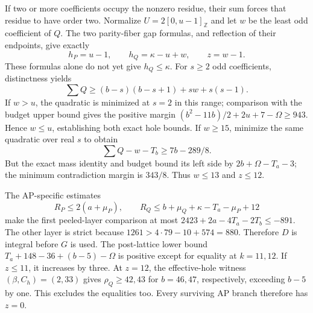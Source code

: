 \documentclass[11pt,a4paper]{article}
\theoremstyle{remark}
\newcommand{\Z}{\mathbb Z}
\begin{document}
If two or more coefficients occupy the nonzero residue, their sum
forces that residue to have order two. Normalize
$U=2[0,u-1]_{\Z}$ and let $w$ be the least odd coefficient of $Q$.
The two parity-fiber gap formulas, and reflection of their endpoints,
give exactly
\[
 h_P=u-1,\qquad h_Q=\kappa-u+w,\qquad z=w-1.
\]
These formulas alone do not yet give $h_Q\le\kappa$.
For $s\ge2$ odd coefficients, distinctness yields
\[
 \sum Q\ge(b-s)(b-s+1)+sw+s(s-1).
\]
If $w>u$, the quadratic is minimized at $s=2$ in this range;
comparison with the budget upper bound gives the positive margin
$(b^2-11b)/2+2u+7-\Omega\ge943$. Hence $w\le u$, establishing both
exact hole bounds. If $w\ge15$, minimize the same quadratic over real
$s$ to obtain
\[
 \sum Q-w-T_b\ge7b-289/8.
\]
But the exact mass identity and budget bound its left side by
$2b+\Omega-T_a-3$; the minimum contradiction margin is $343/8$.
Thus $w\le13$ and $z\le12$.

The AP-specific estimates
\[
 R_P\le2(a+\mu_P),\qquad
 R_Q\le b+\mu_Q+\kappa-T_a-\mu_P+12
\]
make the first peeled-layer comparison at most
$2423+2a-4T_a-2T_b\le-891$. The other layer is strict because
$1261>4\cdot79-10+574=880$. Therefore $D$ is integral before $G$ is
used. The post-lattice lower bound
$T_a+148-36+(b-5)-\Omega$ is positive except for equality at $k=11,12$.
If $z\le11$, it increases by three. At $z=12$, the effective-hole
witness $(\beta,C_h)=(2,33)$ gives $\rho_Q\ge42,43$ for $b=46,47$,
respectively, exceeding $b-5$ by one. This excludes the equalities too.
Every surviving AP branch therefore has $z=0$.
\end{document}
